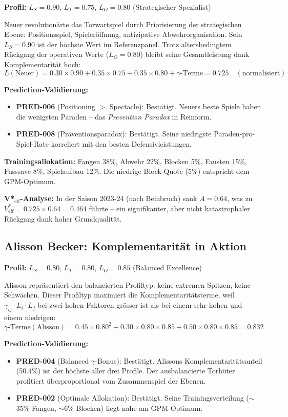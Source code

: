 \documentclass[12pt,a4paper]{article}
\begin{document}
\textbf{Profil:} $L_S = 0.90$, $L_T = 0.75$, $L_O = 0.80$ (Strategischer Spezialist)

Neuer revolution\"arte das Torwartspiel durch Priorisierung der strategischen Ebene: Positionsspiel, Spieler\"offnung, antizipative Abwehrorganisation. Sein $L_S = 0.90$ ist der h\"ochste Wert im Referenzpanel. Trotz altersbedingtem R\"uckgang der operativen Werte ($L_O = 0.80$) bleibt seine Gesamtleistung dank Komplementarit\"at hoch:
\[
L(\text{Neuer}) = 0.30 \times 0.90 + 0.35 \times 0.75 + 0.35 \times 0.80 + \gamma\text{-Terme} = 0.725 \quad (\text{normalisiert})
\]

\textbf{Prediction-Validierung:}
\begin{itemize}
\item \textbf{PRED-006} (Positioning $>$ Spectacle): Best\"atigt. Neuers beste Spiele haben die wenigsten Paraden -- das \emph{Prevention Paradox} in Reinform.
\item \textbf{PRED-008} (Pr\"aventionsparadox): Best\"atigt. Seine niedrigste Paraden-pro-Spiel-Rate korreliert mit den besten Defensivleistungen.
\end{itemize}

\textbf{Trainingsallokation:} Fangen 38\%, Abwehr 22\%, Blocken 5\%, Fausten 15\%, Fusssave 8\%, Spielaufbau 12\%. Die niedrige Block-Quote (5\%) entspricht dem GPM-Optimum.

\textbf{V*$_{\text{eff}}$-Analyse:} In der Saison 2023-24 (nach Beinbruch) sank $A = 0.64$, was zu $V^{*}_{\text{eff}} = 0.725 \times 0.64 = 0.464$ f\"uhrte -- ein signifikanter, aber nicht katastrophaler R\"uckgang dank hoher Grundqualit\"at.

\subsection{Alisson Becker: Komplementarit\"at in Aktion}
\label{sec:cs_alisson}

\textbf{Profil:} $L_S = 0.80$, $L_T = 0.80$, $L_O = 0.85$ (Balanced Excellence)

Alisson repr\"asentiert den balancierten Profiltyp: keine extremen Spitzen, keine Schw\"achen. Dieser Profiltyp maximiert die Komplementarit\"atsterme, weil $\gamma_{ij} \cdot L_i \cdot L_j$ bei zwei hohen Faktoren gr\"osser ist als bei einem sehr hohen und einem niedrigen:
\[
\gamma\text{-Terme}(\text{Alisson}) = 0.45 \times 0.80^2 + 0.30 \times 0.80 \times 0.85 + 0.50 \times 0.80 \times 0.85 = 0.832
\]

\textbf{Prediction-Validierung:}
\begin{itemize}
\item \textbf{PRED-004} (Balanced $\gamma$-Bonus): Best\"atigt. Alissons Komplementarit\"atsanteil (50.4\%) ist der h\"ochste aller drei Profile. Der ausbalancierte Torh\"uter profitiert \"uberproportional vom Zusammenspiel der Ebenen.
\item \textbf{PRED-002} (Optimale Allokation): Best\"atigt. Seine Trainingsverteilung ($\sim$35\% Fangen, $\sim$6\% Blocken) liegt nahe am GPM-Optimum.
\end{itemize}
\end{document}
